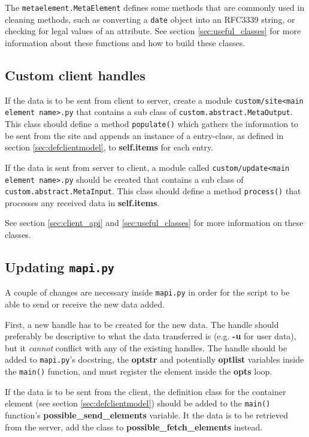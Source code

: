 The \texttt{metaelement.MetaElement} defines some methods that are commonly
used in cleaning methods, such as converting a \texttt{date} object into an
RFC3339 string, or checking for legal values of an attribute. See section
\ref{sec:useful_classes} for more information about these functions and how to
build these classes.

\subsection{Custom client handles}
If the data is to be sent from client to server, create a module
\texttt{custom/site<main element name>.py} that contains a sub class of
\texttt{custom.abstract.MetaOutput}. This class should define a method
\texttt{populate()} which gathers the information to be sent from the site and
appends an instance of a entry-class, as defined in section
\ref{sec:defclientmodel}, to \textbf{self.items} for each entry.

If the data is sent from server to client, a module called
\texttt{custom/update<main element name>.py} should be created that contains a
sub class of \\ \texttt{custom.abstract.MetaInput}. This class should define a
method \texttt{process()} that processes any received data in
\textbf{self.items}.  

See section \ref{sec:client_api} and \ref{sec:useful_classes} for more
information on these classes.

\subsection{Updating \texttt{mapi.py}}
A couple of changes are necessary inside \texttt{mapi.py} in order for the
script to be able to send or receive the new data added. 

First, a new handle has to be created for the new data. The handle should
preferably be descriptive to what the data transferred is (e.g. \textbf{-u} for
user data), but it \textit{cannot} conflict with any of the existing handles.
The handle should be added to \texttt{mapi.py}'s docstring, the \textbf{optstr}
and potentially \textbf{optlist} variables inside the \texttt{main()} function,
and must register the element inside the \textbf{opts} loop. 

If the data is to be sent from the client, the definition class for the
container element (see section \ref{sec:defclientmodel}) should be added to the
\texttt{main()} function's \textbf{possible\_send\_elements} variable. It the
data is to be retrieved from the server, add the class to
\textbf{possible\_fetch\_elements} instead.

